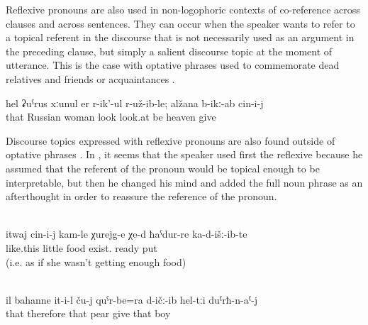 Reflexive pronouns are also used in non-logophoric contexts of co-reference across clauses and across sentences. They can occur when the speaker wants to refer to a topical referent in the discourse that is not necessarily used as an argument in the preceding clause, but simply a salient discourse topic at the moment of utterance. This is the case with optative phrases used to commemorate dead relatives and friends or acquaintances .
%
\begin{exe}
	\ex	\label{ex:It turned out that the Russian woman had looked}
	\gll	hel	ʡuˁrus	xːunul	er	r-ik'-ul	r-už-ib-le;	alžana	b-ikː-ab	cin-i-j\\
		that	Russian	woman	look	look.at	be	heaven	give	\\
	\glt	{} 
\end{exe}

Discourse topics expressed with reflexive pronouns are also found outside of optative phrases . In , it seems that the speaker used first the reflexive because he assumed that the referent of the pronoun would be topical enough to be interpretable, but then he changed his mind and added the full noun phrase as an afterthought in order to reassure the reference of the pronoun.
%
\begin{exe}
	\\	\label{ex:‎Like this there is a little food prepared and served for her}
	\gll	itwaj	cin-i-j	kam-le	χurejg-e	χe-d	ħaˁdur-re	ka-d-išː-ib-te\\
		like.this		little	food	exist.	ready	put\\
	\glt	{} (i.e. as if she wasn't getting enough food)

	\\	\label{ex:therefore he gave them pears, to the boys}
	\gll	il	bahanne	it-i-l	ču-j	quˁr-be=ra	d-ičː-ib	hel-tːi	duˁrħ-n-aˁ-j\\
		that	therefore	that		pear	give	that	boy\\
	\glt	{}
\end{exe}

